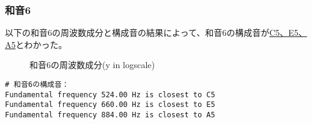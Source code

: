 \documentclass{article}
\begin{document}
\begin{spacing}{1.2}
        \subsubsection*{和音6}
        以下の和音6の周波数成分と構成音の結果によって、和音6の構成音が\underline{C5、E5、A5}とわかった。
        \begin{figure}[ht] %
            \centering
            \caption{和音6の周波数成分(y in logscale)}
        \end{figure}
        \FloatBarrier
        \begin{lstlisting}
# 和音6の構成音：
Fundamental frequency 524.00 Hz is closest to C5
Fundamental frequency 660.00 Hz is closest to E5
Fundamental frequency 884.00 Hz is closest to A5
        \end{lstlisting}
    \end{spacing}
\newpage
\end{document}
